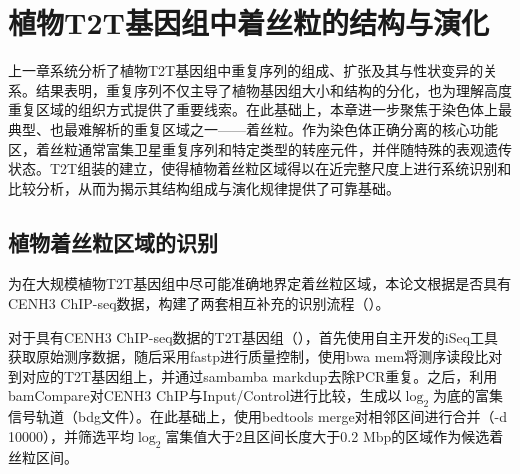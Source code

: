 


\section{植物T2T基因组中着丝粒的结构与演化}

上一章系统分析了植物T2T基因组中重复序列的组成、扩张及其与性状变异的关系。结果表明，重复序列不仅主导了植物基因组大小和结构的分化，也为理解高度重复区域的组织方式提供了重要线索。在此基础上，本章进一步聚焦于染色体上最典型、也最难解析的重复区域之一——着丝粒。作为染色体正确分离的核心功能区，着丝粒通常富集卫星重复序列和特定类型的转座元件，并伴随特殊的表观遗传状态。T2T组装的建立，使得植物着丝粒区域得以在近完整尺度上进行系统识别和比较分析，从而为揭示其结构组成与演化规律提供了可靠基础。

\subsection{植物着丝粒区域的识别}

为在大规模植物T2T基因组中尽可能准确地界定着丝粒区域，本论文根据是否具有CENH3 ChIP-seq数据，构建了两套相互补充的识别流程（）。

对于具有CENH3 ChIP-seq数据的T2T基因组（），首先使用自主开发的iSeq工具获取原始测序数据，随后采用fastp进行质量控制\cite{chen2018fastp}，使用bwa mem将测序读段比对到对应的T2T基因组上\cite{jung2022bwa}，并通过sambamba markdup去除PCR重复\cite{tarasov2015sambamba}。之后，利用bamCompare对CENH3 ChIP与Input/Control进行比较\cite{ramirez2014deeptools}，生成以$\log_2$为底的富集信号轨道（bdg文件）。在此基础上，使用bedtools merge对相邻区间进行合并（-d 10000）\cite{quinlan2010bedtools}，并筛选平均$\log_2$富集值大于2且区间长度大于0.2 Mbp的区域作为候选着丝粒区间。

